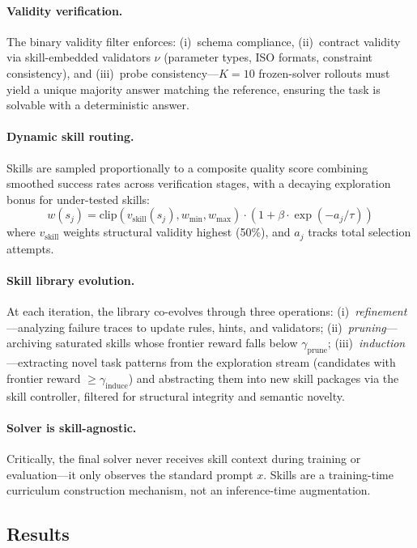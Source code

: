 \documentclass[11pt,a4paper]{article}
\begin{document}
\paragraph{Validity verification.}
The binary validity filter enforces: (i)~schema compliance, (ii)~contract validity via skill-embedded validators $\nu$ (parameter types, ISO formats, constraint consistency), and (iii)~probe consistency---$K=10$ frozen-solver rollouts must yield a unique majority answer matching the reference, ensuring the task is solvable with a deterministic answer.

\paragraph{Dynamic skill routing.}
Skills are sampled proportionally to a composite quality score combining smoothed success rates across verification stages, with a decaying exploration bonus for under-tested skills:
\begin{equation}
    w(s_j) = \text{clip}(v_{\text{skill}}(s_j), w_{\min}, w_{\max}) \cdot \left(1 + \beta \cdot \exp(-a_j/\tau)\right)
\end{equation}
where $v_{\text{skill}}$ weights structural validity highest (50\%), and $a_j$ tracks total selection attempts.

\paragraph{Skill library evolution.}
At each iteration, the library co-evolves through three operations: (i)~\emph{refinement}---analyzing failure traces to update rules, hints, and validators; (ii)~\emph{pruning}---archiving saturated skills whose frontier reward falls below $\gamma_{\text{prune}}$; (iii)~\emph{induction}---extracting novel task patterns from the exploration stream (candidates with frontier reward $\geq \gamma_{\text{induce}}$) and abstracting them into new skill packages via the skill controller, filtered for structural integrity and semantic novelty.

\paragraph{Solver is skill-agnostic.}
Critically, the final solver never receives skill context during training or evaluation---it only observes the standard prompt $x$. Skills are a training-time curriculum construction mechanism, not an inference-time augmentation.

\subsection{Results}
\end{document}
